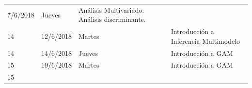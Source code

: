 \documentclass[]{book}
\theoremstyle{definition}
\theoremstyle{definition}
\theoremstyle{definition}
\theoremstyle{remark}
\begin{document}
\begin{longtable}[]{@{}llll@{}}
\begin{minipage}[t]{0.07\columnwidth}
7/6/2018\strut
\end{minipage} & \begin{minipage}[t]{0.05\columnwidth}\raggedright
Jueves\strut
\end{minipage} & \begin{minipage}[t]{0.71\columnwidth}\raggedright
Análisis Multivariado: Análisis discriminante.\strut
\end{minipage}\tabularnewline
\begin{minipage}[t]{0.05\columnwidth}\raggedright
14\strut
\end{minipage} & \begin{minipage}[t]{0.07\columnwidth}\raggedright
12/6/2018\strut
\end{minipage} & \begin{minipage}[t]{0.05\columnwidth}\raggedright
Martes\strut
\end{minipage} & \begin{minipage}[t]{0.71\columnwidth}\raggedright
Introducción a Inferencia Multimodelo\strut
\end{minipage}\tabularnewline
\begin{minipage}[t]{0.05\columnwidth}\raggedright
14\strut
\end{minipage} & \begin{minipage}[t]{0.07\columnwidth}\raggedright
14/6/2018\strut
\end{minipage} & \begin{minipage}[t]{0.05\columnwidth}\raggedright
Jueves\strut
\end{minipage} & \begin{minipage}[t]{0.71\columnwidth}\raggedright
Introducción a GAM\strut
\end{minipage}\tabularnewline
\begin{minipage}[t]{0.05\columnwidth}\raggedright
15\strut
\end{minipage} & \begin{minipage}[t]{0.07\columnwidth}\raggedright
19/6/2018\strut
\end{minipage} & \begin{minipage}[t]{0.05\columnwidth}\raggedright
Martes\strut
\end{minipage} & \begin{minipage}[t]{0.71\columnwidth}\raggedright
Introducción a GAM\strut
\end{minipage}\tabularnewline
\begin{minipage}[t]{0.05\columnwidth}\raggedright
15\strut
\end{minipage} & \begin{minipage}[t]{0.07\columnwidth}\raggedright

\end{minipage}
\end{longtable}
\end{document}
